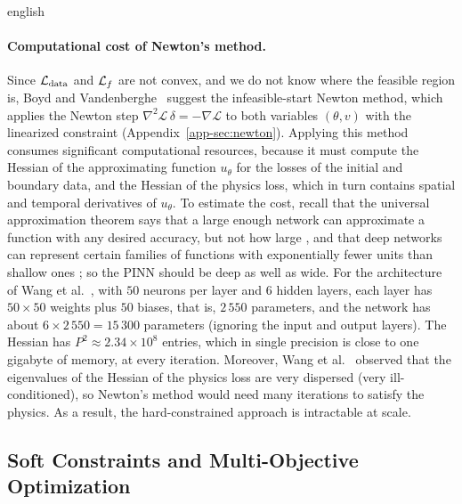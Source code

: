 \documentclass[../0000.tex]{subfiles}
\begin{document}
\begin{hyphenrules}{english}
\paragraph{Computational cost of Newton's method.}
Since $\mathcal{L}_{\mathrm{data}}$ and $\mathcal{L}_f$ are not convex, and we do not know where the feasible region
is, Boyd and Vandenberghe~\cite{boyd2004} suggest the infeasible-start Newton method, which applies the Newton step
$\nabla^2\mathscr{L}\,\delta=-\nabla\mathscr{L}$ to both variables $(\theta,v)$ with the linearized
constraint (Appendix~\ref{app-sec:newton}).
Applying this method consumes significant computational resources, because it must compute the Hessian
of the approximating function $u_\theta$ for the losses of the initial and boundary data, and the
Hessian of the physics loss, which in turn contains spatial and temporal derivatives of $u_\theta$. To
estimate the cost, recall that the universal approximation theorem says that a large enough network
can approximate a function with any desired accuracy, but not how large \cite{lecun2015}, and that
deep networks can represent certain families of functions with exponentially fewer units than shallow
ones \cite{delalleau2011}; so the PINN should be deep as well as wide. For the architecture of
Wang et al.~\cite{wang2021gradient}, with $50$ neurons per layer and $6$ hidden layers, each layer has
$50\times50$ weights plus $50$ biases, that is, $2\,550$ parameters, and the network has about
$6\times2\,550=15\,300$ parameters (ignoring the input and output layers). The Hessian has
$P^2\approx2.34\times10^{8}$ entries, which in single precision is close to one gigabyte of memory, at
every iteration. Moreover, Wang et al.~\cite{wang2021gradient} observed that the eigenvalues of the Hessian of
the physics loss are very dispersed (very ill-conditioned), so Newton's method would need many
iterations to satisfy the physics. As a result, the hard-constrained approach is intractable at scale.

\subsection{Soft Constraints and Multi-Objective Optimization}


\end{hyphenrules}
\end{document}
